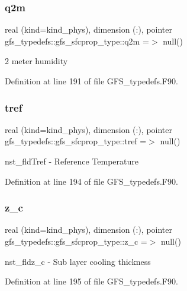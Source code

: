\subsubsection{q2m}
{\footnotesize\ttfamily real (kind=kind\+\_\+phys), dimension    (\+:), pointer gfs\+\_\+typedefs\+::gfs\+\_\+sfcprop\+\_\+type\+::q2m =$>$ null()}



2 meter humidity 



Definition at line 191 of file G\+F\+S\+\_\+typedefs.\+F90.

\mbox{\label{structgfs__typedefs_1_1gfs__sfcprop__type_a3fe52054856408c9ee98694ae4858dd7}} 
\subsubsection{tref}
{\footnotesize\ttfamily real (kind=kind\+\_\+phys), dimension   (\+:), pointer gfs\+\_\+typedefs\+::gfs\+\_\+sfcprop\+\_\+type\+::tref =$>$ null()}



nst\+\_\+fldTref -\/ Reference Temperature 



Definition at line 194 of file G\+F\+S\+\_\+typedefs.\+F90.

\mbox{\label{structgfs__typedefs_1_1gfs__sfcprop__type_a6f488baa6e049b78b311875cd3ea854e}} 
\subsubsection{z\+\_\+c}
{\footnotesize\ttfamily real (kind=kind\+\_\+phys), dimension    (\+:), pointer gfs\+\_\+typedefs\+::gfs\+\_\+sfcprop\+\_\+type\+::z\+\_\+c =$>$ null()}



nst\+\_\+fldz\+\_\+c -\/ Sub layer cooling thickness 



Definition at line 195 of file G\+F\+S\+\_\+typedefs.\+F90.

\mbox{\label{structgfs__typedefs_1_1gfs__sfcprop__type_a3661368479187a4c9c9caad5a933212f}} 

